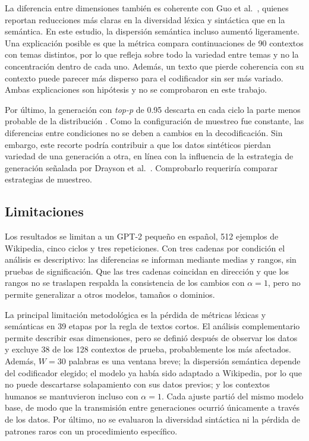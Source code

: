 \documentclass[12pt,letterpaper]{article}
\begin{document}
La diferencia entre dimensiones también es coherente con Guo et al.\
\cite{guo2024}, quienes reportan reducciones más claras en la diversidad
léxica y sintáctica que en la semántica. En este estudio, la dispersión
semántica incluso aumentó ligeramente. Una explicación posible es que la
métrica compara continuaciones de 90 contextos con temas distintos, por lo
que refleja sobre todo la variedad entre temas y no la concentración dentro
de cada uno. Además, un texto que pierde coherencia con su contexto puede
parecer más disperso para el codificador sin ser más variado. Ambas
explicaciones son hipótesis y no se comprobaron en este trabajo.

Por último, la generación con \textit{top-p} de 0.95 descarta en cada ciclo
la parte menos probable de la distribución \cite{holtzman2020}. Como la
configuración de muestreo fue constante, las diferencias entre condiciones
no se deben a cambios en la decodificación. Sin embargo, este recorte
podría contribuir a que los datos sintéticos pierdan variedad de una
generación a otra, en línea con la influencia de la estrategia de
generación señalada por Drayson et al.\ \cite{drayson2025}. Comprobarlo
requeriría comparar estrategias de muestreo.

\subsection{Limitaciones}

Los resultados se limitan a un GPT-2 pequeño en español, 512 ejemplos de
Wikipedia, cinco ciclos y tres repeticiones. Con tres cadenas por condición
el análisis es descriptivo: las diferencias se informan mediante medias y
rangos, sin pruebas de significación. Que las tres cadenas coincidan en
dirección y que los rangos no se traslapen respalda la consistencia de los
cambios con \(\alpha=1\), pero no permite generalizar a otros modelos,
tamaños o dominios.

La principal limitación metodológica es la pérdida de métricas léxicas y
semánticas en 39 etapas por la regla de textos cortos. El análisis
complementario permite describir esas dimensiones, pero se definió después
de observar los datos y excluye 38 de los 128 contextos de prueba,
probablemente los más afectados. Además, \(W=30\) palabras es una ventana
breve; la dispersión semántica depende del codificador elegido; el modelo
ya había sido adaptado a Wikipedia, por lo que no puede descartarse
solapamiento con sus datos previos; y los contextos humanos se mantuvieron
incluso con \(\alpha=1\). Cada ajuste partió del mismo modelo base, de modo
que la transmisión entre generaciones ocurrió únicamente a través de los
datos. Por último, no se evaluaron la diversidad sintáctica ni la pérdida
de patrones raros con un procedimiento específico.
\end{document}
